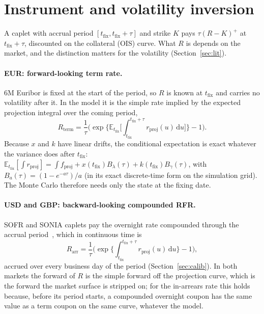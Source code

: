 \documentclass[11pt]{article}
\begin{document}
\section{Instrument and volatility inversion}
\label{sec:instrument}
A caplet with accrual period \([t_{\text{fix}},t_{\text{fix}}+\tau]\) and strike \(K\) pays
\(\tau(R-K)^{+}\) at \(t_{\text{fix}}+\tau\), discounted on the collateral (OIS) curve. What
\(R\) is depends on the market, and the distinction matters for the volatility
(Section~\ref{sec:lit}).

\paragraph{EUR: forward-looking term rate.} 6M Euribor is fixed at the start of the period, so
\(R\) is known at \(t_{\text{fix}}\) and carries no volatility after it. In the model it is the
simple rate implied by the expected projection integral over the coming period,
\begin{equation}
R_{\text{term}} = \frac{1}{\tau}\Big(\exp\Big\{\mathbb{E}_{t_{\text{fix}}}\Big[\int_{t_{\text{fix}}}^{t_{\text{fix}}+\tau}
r_{\text{proj}}(u)\,\mathrm{d}u\Big]\Big\}-1\Big).
\end{equation}
Because \(x\) and \(k\) have linear drifts, the conditional expectation is exact whatever the
variance does after \(t_{\text{fix}}\):
\(\mathbb{E}_{t_{\text{fix}}}[\int r_{\text{proj}}] = \int f_{\text{proj}} + x(t_{\text{fix}})B_\lambda(\tau) +
k(t_{\text{fix}})B_\gamma(\tau)\), with \(B_a(\tau)=(1-e^{-a\tau})/a\) (in its exact
discrete-time form on the simulation grid). The Monte Carlo therefore needs only the state at the
fixing date.

\paragraph{USD and GBP: backward-looking compounded RFR.} SOFR and SONIA caplets pay the
overnight rate compounded through the accrual period~\cite{lyashenko2019}, which in
continuous time is
\begin{equation}
R_{\text{arr}} = \frac{1}{\tau}\Big(\exp\Big\{\int_{t_{\text{fix}}}^{t_{\text{fix}}+\tau}
r_{\text{proj}}(u)\,\mathrm{d}u\Big\}-1\Big),
\end{equation}
accrued over every business day of the period (Section~\ref{sec:calib}). In both markets the
forward of \(R\) is the simple forward off the projection curve, which is the forward the market
surface is stripped on; for the in-arrears rate this holds because, before its period starts, a
compounded overnight coupon has the same value as a term coupon on the same curve, whatever the
model.
\end{document}
